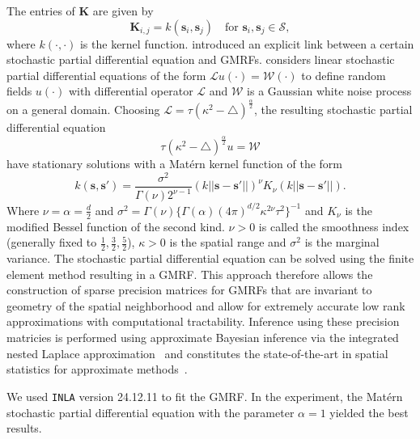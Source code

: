 The entries of $\mathbf{K}$ are given by
\begin{equation*}
    \mathbf{K}_{i, j}  = k(\mathbf{s}_{i}, \mathbf{s}_{j}) \quad \text{for } \mathbf{s}_{i}, \mathbf{s}_{j} \in \mathcal{S},
\end{equation*}
where $k(\cdot, \cdot)$ is the kernel function. 
\citet{Lindgren2011-fv} introduced an explicit link between a certain stochastic partial differential equation and GMRFs. \citet{Lindgren2011-fv} considers linear stochastic partial differential equations of the form $\mathcal{L} u(\cdot) = \mathcal{W}(\cdot)$ to define random fields $u(\cdot)$ with differential operator $\mathcal{L}$ and $\mathcal{W}$ is a Gaussian white noise process on a general domain. Choosing $\mathcal{L}=\tau(\kappa^2-\triangle)^{\frac{\alpha}{2}}$, the resulting stochastic partial differential equation
\begin{equation*}
    \tau(\kappa^2-\triangle)^{\frac{\alpha}{2}} u = \mathcal{W}
\end{equation*}
have stationary solutions with a Matérn kernel function of the form 
\begin{equation*}
    k(\mathbf{s}, \mathbf{s}') = \frac{\sigma^2}{\Gamma(\nu)2^{\nu-1}}(k||\mathbf{s}-\mathbf{s}'||)^\nu K_\nu (k||\mathbf{s}-\mathbf{s}'||).
\end{equation*}
Where $\nu=\alpha = \frac{d}{2}$ and $\sigma^2 = \Gamma(\nu)\{\Gamma(\alpha)(4\pi)^{d/2}\kappa^{2\nu}\tau^2\}^{-1}$ and $K_\nu$ is the modified Bessel function of the second kind. $\nu>0$ is called the smoothness index (generally fixed to $\frac{1}{2},\frac{3}{2},\frac{5}{2}$), $\kappa>0$ is the spatial range and $\sigma^2$ is the marginal variance. The stochastic partial differential equation can be solved using the finite element method resulting in a GMRF. This approach therefore allows the construction of sparse precision matrices for GMRFs that are invariant to geometry of the spatial neighborhood and allow for extremely accurate low rank approximations with computational tractability. Inference using these precision matricies is performed using approximate Bayesian inference via the integrated nested Laplace approximation~\citep{Rue2009-ty} and constitutes the state-of-the-art in spatial statistics for approximate methods~\citep{Heaton2017-vl}. 

We used \texttt{INLA} version 24.12.11 to fit the GMRF. 
In the experiment, the Matérn stochastic partial differential equation with the parameter $\alpha = 1$ yielded the best results.
